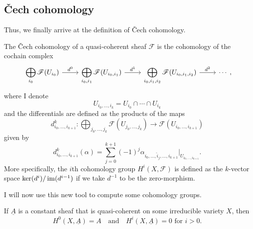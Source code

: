 \subsection{\v Cech cohomology}
Thus, we finally arrive at the definition of \v Cech cohomology.
\begin{defin}\label{def:cech}
  The \v Cech cohomology of a quasi-coherent sheaf $\mathscr{F}$ is the
  cohomology of the cochain complex
  \[\begin{tikzcd}
      \displaystyle\bigoplus_{i_{0}}\mathscr{F}(U_{i_{0}})\rar{d^{0}}
      & \displaystyle\bigoplus_{i_{0},i_{1}}\mathscr{F}(U_{i_{0},i_{1}})
      \rar{d^{1}}
      & \displaystyle\bigoplus_{i_{0},i_{1},i_{2}}
      \mathscr{F}(U_{i_{0},i_{1},i_{2}})\rar{d^{2}} & \cdots
    \end{tikzcd},\]
  where I denote
  \[U_{i_{0},\ldots, i_{k}}=U_{i_{0}}\cap\cdots\cap U_{i_{k}}\]
  and the differentials are defined as the products of the maps
  \[d_{i_{0},\ldots,i_{k+1}}^{k}:\displaystyle\bigoplus_{j_{0},\ldots,j_{k}}
  \mathscr{F}(U_{j_{0},\ldots,j_{k}})\to \mathscr{F}(U_{i_{0},\ldots,i_{k+1}})\]
  given by
  \[
    d_{i_{0},\ldots,i_{k+1}}^{k}(\alpha)
    =\sum_{j=0}^{k+1}(-1)^{j}\alpha_{i_{0},\ldots,\hat{i}_{j},\ldots,i_{k+1}}
    \vert_{U_{i_{0},\ldots,i_{k+1}}}.
  \]
  More specifically, the $i$th cohomology group $H^{i}(X,\mathscr{F})$
  is defined as the $k$-vector space $\ker(d^{i})/\operatorname{im}(d^{i-1})$ if we
  take $d^{-1}$ to be the zero-morphism.
\end{defin}
I will now use this new tool to compute some cohomology groups.
\begin{prop}\label{prop:const_sheaf}
  If $\underline{A}$ is a constant sheaf that is quasi-coherent on some
  irreducible variety $X$, then
  \[
    H^{0}(X,\underline{A}) = A\quad\text{and}
    \quad H^{i}(X,\underline{A})=0\text{ for }i>0.
  \]
\end{prop}
